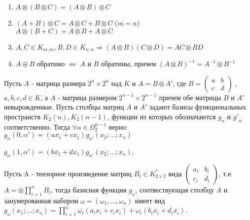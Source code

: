 \utv
\begin{enumerate}
    \item $A \otimes (B \otimes C) = (A \otimes B) \otimes C$
    \item $(A + B) \otimes C = A \otimes C + B \otimes C $ ($m = n$) \\
          $A \otimes (B + C) = A \otimes B + A \otimes C $
    \item $A,C  \in K_{m;m}, B,D \in K_{n;n} \Rightarrow (A \otimes B)(C \otimes D) = AC \otimes BD$
    \item $A \oplus B$ обратимо $\Leftrightarrow$ $A$ и $B$ обратимы, причем $(A \otimes B)^{-1} = A^{-1} \otimes B^{-1}$
\end{enumerate}

\lem Пусть $A$ - матрица размера $2^n \times 2^n$ над $K$ и $A = B \otimes A'$, где $B = \begin{pmatrix}
    a & b\\
    c & d
\end{pmatrix}$
, $a,b,c,d \in K$, а $A$ - матрица размером $2^{n-1} \times 2^{n-1}$ причем обе матрицы $B$ и  $A'$ невырожденные.
Пусть столбцы матриц $A$ и $A'$ задают базисы функциональных пространств $K_2(n), K_2(n-1)$, функции из которых обозначаются $g_\alpha$ и ${g'}_\alpha$ соответственно.
Тогда $\forall \alpha \in \Omega_2^{n-1}$ верно:\\

$g_\alpha(0, \alpha') = (a \overline{x_1} + c x_1)g_{\alpha'}(x_2; \dots ;x_n)$\par
$g_\alpha(1, \alpha') = (b \overline{x_1} + d x_1)g_{\alpha'}(x_2; \dots ;x_n)$.

\thr Пусть A - тензорное произведение матриц $B_i \in K_{2\times2}^*$ вида $\begin{pmatrix}
    a_i & b_i\\
    c_i & d_i
\end{pmatrix}$,
т.е. $A = \otimes \prod_{i = 1}^n B_i$, тогда базисная функция $g_\omega$, соотвествующая столбцу $A$ и занумерованная набором $\omega = (\omega_1, \dots, \omega_n)$ имеет вид
$g_\omega(x_1; \dots; x_n) = \prod_{i=1}^n \overline{\omega_i}(a_ix_i + c_ix_i) + \omega_i(b_i\overline{x_i} + d_i\overline{x_i})$.


